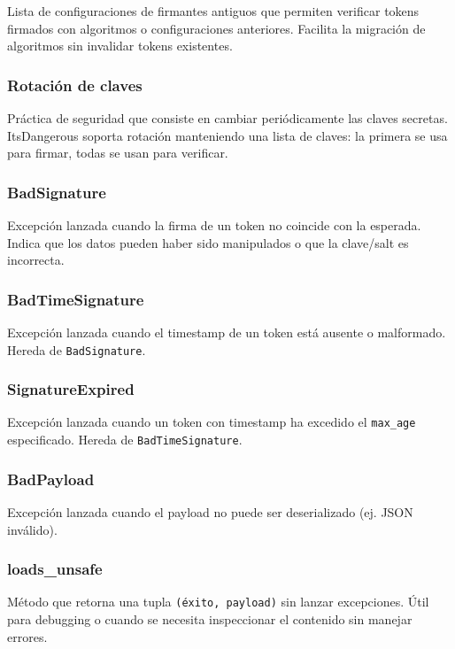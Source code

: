 \documentclass[11pt,a4paper]{article}
\begin{document}
Lista de configuraciones de firmantes antiguos que permiten verificar tokens firmados con algoritmos o configuraciones anteriores. Facilita la migración de algoritmos sin invalidar tokens existentes.


\subsubsection*{Rotación de claves}


Práctica de seguridad que consiste en cambiar periódicamente las claves secretas. ItsDangerous soporta rotación manteniendo una lista de claves: la primera se usa para firmar, todas se usan para verificar.


\subsubsection*{BadSignature}


Excepción lanzada cuando la firma de un token no coincide con la esperada. Indica que los datos pueden haber sido manipulados o que la clave/salt es incorrecta.


\subsubsection*{BadTimeSignature}


Excepción lanzada cuando el timestamp de un token está ausente o malformado. Hereda de \texttt{BadSignature}.


\subsubsection*{SignatureExpired}


Excepción lanzada cuando un token con timestamp ha excedido el \texttt{max\_age} especificado. Hereda de \texttt{BadTimeSignature}.


\subsubsection*{BadPayload}


Excepción lanzada cuando el payload no puede ser deserializado (ej. JSON inválido).


\subsubsection*{loads\_unsafe}


Método que retorna una tupla \texttt{(éxito, payload)} sin lanzar excepciones. Útil para debugging o cuando se necesita inspeccionar el contenido sin manejar errores.
\end{document}
